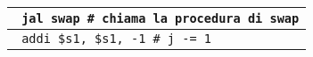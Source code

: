\documentclass[../main.tex]{subfiles}
\begin{document}
\begin{tabular}{ l }
    \texttt{\hspace*{0cm} \hspace*{0cm} \hspace*{0cm} \hspace*{0cm} \hspace*{0cm} \hspace*{0cm} \hspace*{0cm} \hspace*{0cm} \hspace*{0cm} jal swap \hspace*{0cm} \hspace*{0cm} \hspace*{0cm} \hspace*{0cm} \hspace*{0cm} \hspace*{0cm} \hspace*{0cm} \hspace*{0cm} \hspace*{0cm} \hspace*{0cm} \hspace*{0cm} \hspace*{0cm} \hspace*{0cm} \hspace*{0cm} \# chiama la procedura di swap} \\
    \hline
    \hline
    \texttt{\hspace*{0cm} \hspace*{0cm} \hspace*{0cm} \hspace*{0cm} \hspace*{0cm} \hspace*{0cm} \hspace*{0cm} \hspace*{0cm} \hspace*{0cm} addi \$s1, \$s1, -1 \hspace*{0cm} \hspace*{0cm} \hspace*{0cm} \hspace*{0cm} \hspace*{0cm} \# j -= 1} \\

\end{tabular}
\end{document}
